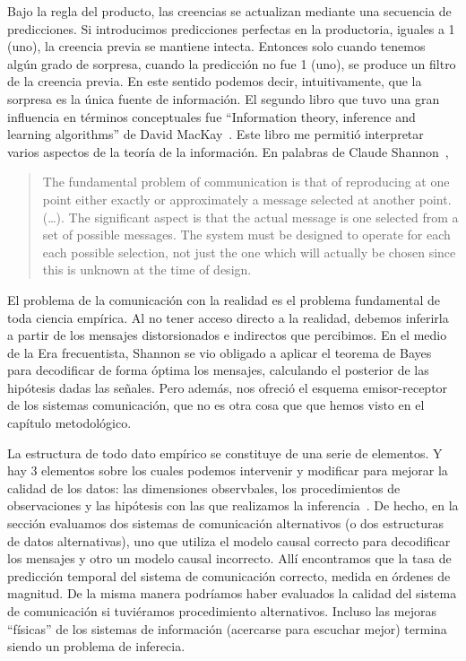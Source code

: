 \documentclass[a4paper,11pt]{book}
\theoremstyle{definition}
\begin{document}
Bajo la regla del producto, las creencias se actualizan mediante una secuencia de predicciones.
%
Si introducimos predicciones perfectas en la productoria, iguales a 1 (uno), la creencia previa se mantiene intecta.
%
Entonces solo cuando tenemos algún grado de sorpresa, cuando la predicción no fue 1 (uno), se produce un filtro de la creencia previa.
%
En este sentido podemos decir, intuitivamente, que la sorpresa es la única fuente de información.
%
El segundo libro que tuvo una gran influencia en términos conceptuales fue ``Information theory, inference and learning algorithms'' de David MacKay~\cite{mackay2003-informationInferenceLearning}.
%
Este libro me permitió interpretar varios aspectos de la teoría de la información.
%
En palabras de Claude Shannon~\cite{shannon1948-theoryOfCommunication},
%
\begin{quotation}
The fundamental problem of communication is that of reproducing at one point either exactly or approximately a message selected at another point.
(\dots).
The significant aspect is that the actual message is one selected from a set of possible messages.
The system must be designed to operate for each each possible selection, not just the one which will actually be chosen since this is unknown at the time of design.
\end{quotation}
%
El problema de la comunicación con la realidad es el problema fundamental de toda ciencia empírica.
%
Al no tener acceso directo a la realidad, debemos inferirla a partir de los mensajes distorsionados e indirectos que percibimos.
%
En el medio de la Era frecuentista, Shannon se vio obligado a aplicar el teorema de Bayes para decodificar de forma óptima los mensajes, calculando el posterior de las hipótesis dadas las señales.
%
Pero además, nos ofreció el esquema emisor-receptor de los sistemas comunicación, que no es otra cosa que \emph{} que hemos visto en el capítulo metodológico.


La estructura de todo dato empírico se constituye de una serie de elementos.
%
Y hay 3 elementos sobre los cuales podemos intervenir y modificar para mejorar la calidad de los datos: las dimensiones observbales, los procedimientos de observaciones y las hipótesis con las que realizamos la inferencia~\cite{samaja1999-epistemologiaYMetodologia}.
%
De hecho, en la sección \emph{} evaluamos dos sistemas de comunicación alternativos (o dos estructuras de datos alternativas), uno que utiliza el modelo causal correcto para decodificar los mensajes y otro un modelo causal incorrecto.
%
Allí encontramos que la tasa de predicción temporal del sistema de comunicación correcto, medida en órdenes de magnitud.
%
De la misma manera podríamos haber evaluados la calidad del sistema de comunicación si tuviéramos procedimiento alternativos.
%
Incluso las mejoras ``físicas'' de los sistemas de información (acercarse para escuchar mejor) termina siendo un problema de inferecia.
\end{document}
